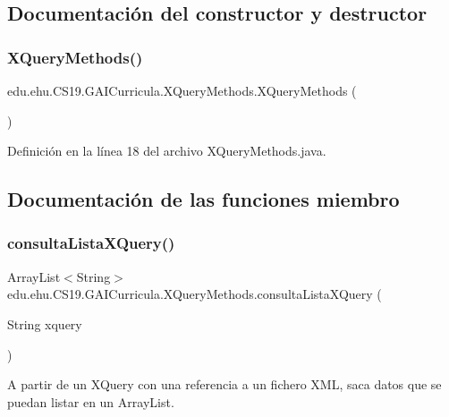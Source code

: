\subsection{Documentación del constructor y destructor}
\mbox{\label{a00033_ade5a845ccb94c1feb5420a2550243985}} 
\subsubsection{\texorpdfstring{XQueryMethods()}{XQueryMethods()}}
{\footnotesize\ttfamily edu.\+ehu.\+C\+S19.\+G\+A\+I\+Curricula.\+X\+Query\+Methods.\+X\+Query\+Methods (\begin{DoxyParamCaption}{ }\end{DoxyParamCaption})}



Definición en la línea 18 del archivo X\+Query\+Methods.\+java.



\subsection{Documentación de las funciones miembro}
\mbox{\label{a00033_a8b0ac4baf3bbd3829073a87325dd714d}} 
\subsubsection{\texorpdfstring{consultaListaXQuery()}{consultaListaXQuery()}}
{\footnotesize\ttfamily Array\+List$<$String$>$ edu.\+ehu.\+C\+S19.\+G\+A\+I\+Curricula.\+X\+Query\+Methods.\+consulta\+Lista\+X\+Query (\begin{DoxyParamCaption}\item[{String}]{xquery }\end{DoxyParamCaption})}



A partir de un X\+Query con una referencia a un fichero X\+ML, saca datos que se puedan listar en un Array\+List. 



